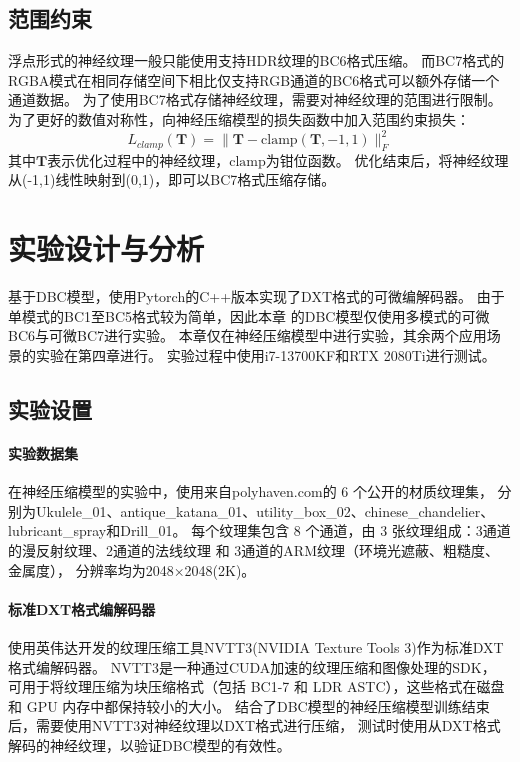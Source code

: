 \subsection{范围约束}
\label{范围约束}

浮点形式的神经纹理一般只能使用支持HDR纹理的BC6格式压缩。
而BC7格式的RGBA模式在相同存储空间下相比仅支持RGB通道的BC6格式可以额外存储一个通道数据。
为了使用BC7格式存储神经纹理，需要对神经纹理的范围进行限制。
为了更好的数值对称性，向神经压缩模型的损失函数中加入范围约束损失：
\begin{equation}
L_{clamp}(\mathbf{T})=\|\mathbf{T}-\text{clamp}(\mathbf{T},-1,1)\|_F^2
\end{equation}
其中$\mathbf{T}$表示优化过程中的神经纹理，$\text{clamp}$为钳位函数。
优化结束后，将神经纹理从(-1,1)线性映射到(0,1)，即可以BC7格式压缩存储。


\section{实验设计与分析}

基于DBC模型，使用Pytorch的C++版本实现了DXT格式的可微编解码器。
由于单模式的BC1至BC5格式较为简单，因此本章
的DBC模型仅使用多模式的可微BC6与可微BC7进行实验。
本章仅在神经压缩模型中进行实验，其余两个应用场景的实验在第四章进行。
实验过程中使用i7-13700KF和RTX 2080Ti进行测试。

\subsection{实验设置}

\paragraph{实验数据集}

在神经压缩模型的实验中，使用来自polyhaven.com\cite{PolyHaven}的 6 个公开的材质纹理集，
分别为Ukulele\_01、antique\_katana\_01、utility\_box\_02、chinese\_chandelier、
lubricant\_spray和Drill\_01。
每个纹理集包含 8 个通道，由 3 张纹理组成：3通道的漫反射纹理、2通道的法线纹理 和 3通道的ARM纹理（环境光遮蔽、粗糙度、金属度），
分辨率均为2048×2048(2K)。

\paragraph{标准DXT格式编解码器}

使用英伟达开发的纹理压缩工具NVTT3\cite{NVTT3}(NVIDIA Texture Tools 3)作为标准DXT格式编解码器。
NVTT3是一种通过CUDA加速的纹理压缩和图像处理的SDK，
可用于将纹理压缩为块压缩格式（包括 BC1-7 和 LDR ASTC），这些格式在磁盘和 GPU 内存中都保持较小的大小。
结合了DBC模型的神经压缩模型训练结束后，需要使用NVTT3对神经纹理以DXT格式进行压缩，
测试时使用从DXT格式解码的神经纹理，以验证DBC模型的有效性。

